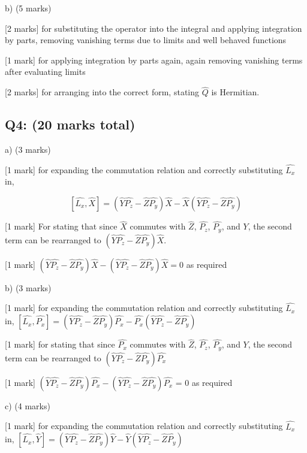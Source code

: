 \documentclass[a4paper,11pt]{article}
\begin{document}
b) (5 marks)

[2 marks] for substituting the operator into the integral and applying integration by parts, removing vanishing terms due to limits and well behaved functions

[1 mark] for applying integration by parts again, again removing vanishing terms after evaluating limits

[2 marks] for arranging into the correct form, stating \(\hat{Q}\) is Hermitian. 

\subsection*{Q4: (20 marks total) }

a) (3 marks)

[1 mark] for expanding the commutation relation and correctly substituting \( \hat{L_{x}} \) in, 

\[ 
\left[ \hat{L_{x}}, \hat{X} \right] = (\hat{Y}\hat{P_{z}} - \hat{Z}\hat{P_{y}})\hat{X} - \hat{X}(\hat{Y}\hat{P_{z}} - \hat{Z}\hat{P_{y}})
\]

[1 mark] For stating that since \( \hat{X} \) commutes with \( \hat{Z} \), \( \hat{P_{z}} \), \( \hat{P_{y}} \), and \( Y \), the second term can be rearranged to \( (\hat{Y}\hat{P_{z}} - \hat{Z}\hat{P_{y}})\hat{X} \).

[1 mark] \( (\hat{Y}\hat{P_{z}} - \hat{Z}\hat{P_{y}})\hat{X} - (\hat{Y}\hat{P_{z}} - \hat{Z}\hat{P_{y}})\hat{X} = 0 \) as required

b) (3 marks)

[1 mark] for expanding the commutation relation and correctly substituting \( \hat{L_{x}} \) in, \([\hat{L_{x}}, \hat{P_{x}}] = (\hat{Y}\hat{P_{z}} - \hat{Z}\hat{P_{y}})\hat{P_{x}} - \hat{P_{x}}(\hat{Y}\hat{P_{z}} - \hat{Z}\hat{P_{y}})\)

[1 mark] for stating that since \( \hat{P_{x}} \) commutes with \( \hat{Z} \), \( \hat{P_{z}} \), \( \hat{P_{y}} \), and \( Y \), the second term can be rearranged to \( (\hat{Y}\hat{P_{z}} - \hat{Z}\hat{P_{y}})\hat{P_{x}} \)

[1 mark] \((\hat{Y}\hat{P_{z}} - \hat{Z}\hat{P_{y}})\hat{P_{x}}  - (\hat{Y}\hat{P_{z}} - \hat{Z}\hat{P_{y}})\hat{P_{x}}\)  = 0 as required

c)  (4 marks)

[1 mark] for expanding the commutation relation and correctly substituting \( \hat{L_{x}} \) in, \([\hat{L_{x}}, \hat{Y}] = (\hat{Y}\hat{P_{z}} - \hat{Z}\hat{P_{y}})\hat{Y} - \hat{Y}(\hat{Y}\hat{P_{z}} - \hat{Z}\hat{P_{y}})\)
\end{document}

